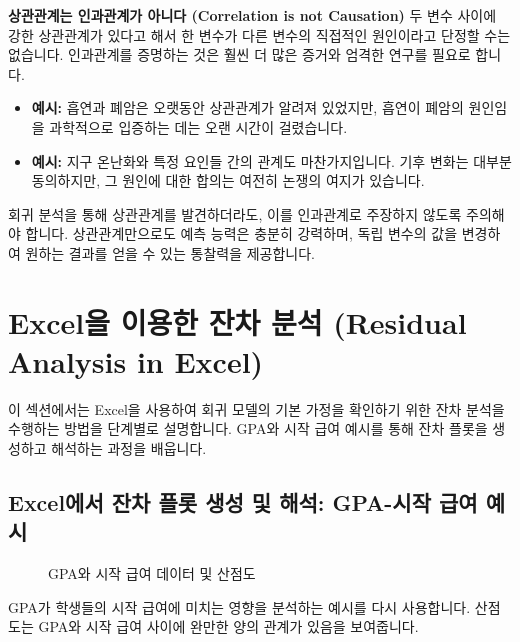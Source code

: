 \documentclass[11pt,a4paper]{article}
\theoremstyle{definition}
\begin{document}
\begin{cautionbox}
\textbf{상관관계는 인과관계가 아니다 (Correlation is not Causation)}
두 변수 사이에 강한 상관관계가 있다고 해서 한 변수가 다른 변수의 직접적인 원인이라고 단정할 수는 없습니다. 인과관계를 증명하는 것은 훨씬 더 많은 증거와 엄격한 연구를 필요로 합니다.
\begin{itemize}
    \item \textbf{예시:} 흡연과 폐암은 오랫동안 상관관계가 알려져 있었지만, 흡연이 폐암의 원인임을 과학적으로 입증하는 데는 오랜 시간이 걸렸습니다.
    \item \textbf{예시:} 지구 온난화와 특정 요인들 간의 관계도 마찬가지입니다. 기후 변화는 대부분 동의하지만, 그 원인에 대한 합의는 여전히 논쟁의 여지가 있습니다.
\end{itemize}
회귀 분석을 통해 상관관계를 발견하더라도, 이를 인과관계로 주장하지 않도록 주의해야 합니다. 상관관계만으로도 예측 능력은 충분히 강력하며, 독립 변수의 값을 변경하여 원하는 결과를 얻을 수 있는 통찰력을 제공합니다.
\end{cautionbox}

\newpage
\section{Excel을 이용한 잔차 분석 (Residual Analysis in Excel)}
이 섹션에서는 Excel을 사용하여 회귀 모델의 기본 가정을 확인하기 위한 잔차 분석을 수행하는 방법을 단계별로 설명합니다. GPA와 시작 급여 예시를 통해 잔차 플롯을 생성하고 해석하는 과정을 배웁니다.

\subsection{Excel에서 잔차 플롯 생성 및 해석: GPA-시작 급여 예시}
\begin{figure}[h!]
    \centering
    \caption{GPA와 시작 급여 데이터 및 산점도}
    \label{fig:gpa_salary_data_scatter}
\end{figure}
GPA가 학생들의 시작 급여에 미치는 영향을 분석하는 예시를 다시 사용합니다. 산점도는 GPA와 시작 급여 사이에 완만한 양의 관계가 있음을 보여줍니다.
\end{document}
